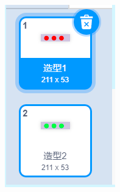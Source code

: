 \documentclass[10pt, a4paper]{article}
\begin{document}
\begin{enumerate}
\begin{figure}[htbp]
\begin{minipage}[t]{.2\textwidth}
\begin{minipage}[t]{.48\textwidth}
                    \includegraphics[width=\textwidth]{19-1.png}
                \end{minipage}
                \begin{minipage}[t]{.48\textwidth}
                    \centering

\end{minipage}
\end{minipage}
\end{figure}
\end{enumerate}
\end{document}
